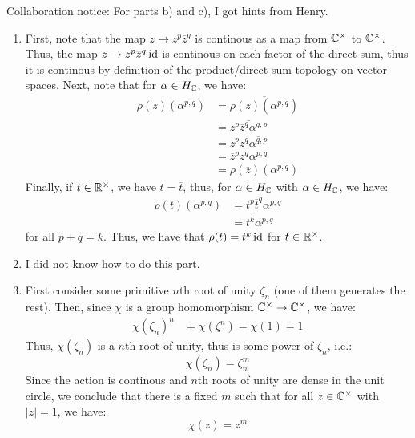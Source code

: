 \documentclass[12pt]{article}
\begin{document}
\begin{solution}
    \bbni
    Collaboration notice: For parts b) and c), I got hints from Henry.
    \begin{enumerate}
        \item First, note that the map $z \to z^p\overline{z}^q$ is continous as a map from $\mathbb C^\times$ to $\mathbb C^\times$. Thus, the map $z \to z^p\overline{z}^q\operatorname{id}$ is continous on each factor of the direct sum, thus it is continous by definition of the product/direct sum topology on vector spaces. \bbni
        Next, note that for $\alpha \in H_\mathbb C$, we have:
        \begin{align*}
            \overline{\rho(z)}(\alpha^{p, q}) &= \overline{\rho(z)(\overline{\alpha^{p,q}})} \\
            &= \overline{z^p\overline{z}^q \alpha^{q,p}} \\
            &= \overline{z}^p z^q \overline{\alpha^{q,p}} \\
            &= \overline{z}^pz^q \alpha^{p,q} \\
            &= \rho(\overline{z})(\alpha^{p,q})
        \end{align*}
        Finally, if $t \in \mathbb R^\times$, we have $t = \overline{t}$, thus, for $\alpha \in H_\mathbb C$ with $\alpha \in H_\mathbb C$, we have:
        \begin{align*}
            \rho(t)(\alpha^{p,q}) &= t^p\overline{t}^q \alpha^{p,q} \\
            &= t^k \alpha^{p,q}
        \end{align*}
        for all $p+q = k$. Thus, we have that $\rho(t) = t^k \operatorname{id}$ for $t \in \mathbb R^\times$. 
        \item I did not know how to do this part. 
        \item First consider some primitive $n$th root of unity $\zeta_n$ (one of them generates the rest). Then, since $\chi$ is a group homomorphism $\mathbb C^\times \to \mathbb C^\times$, we have:
        \begin{align*}
            \chi(\zeta_n)^n &= \chi(\zeta^n) = \chi(1) = 1
        \end{align*} 
        Thus, $\chi(\zeta_n)$ is a $n$th root of unity, thus is some power of $\zeta_n$, i.e.:
        \[ \chi(\zeta_n) = \zeta_n^m\]
        Since the action is continous and $n$th roots of unity are dense in the unit circle, we conclude that there is a fixed $m$ such that for all $z \in \mathbb C^\times$ with $|z| = 1$, we have:
        \[ \chi(z) = z^m\]


\end{enumerate}
\end{solution}
\end{document}
